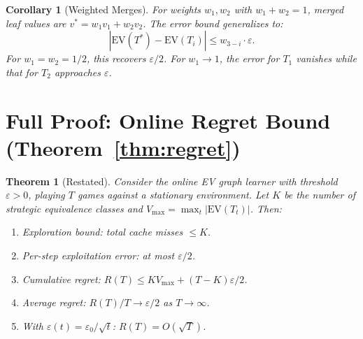 \documentclass[11pt]{article}
\newtheorem*{theorem*}{Theorem}
\newtheorem*{corollary*}{Corollary}
\newcommand{\EV}{\mathrm{EV}}
\begin{document}
\begin{corollary*}[Weighted Merges]
For weights $w_1, w_2$ with $w_1 + w_2 = 1$, merged leaf values are
$v^* = w_1 v_1 + w_2 v_2$. The error bound generalizes to:
\[
  |\EV(T^*) - \EV(T_i)| \le w_{3-i} \cdot \varepsilon.
\]
For $w_1 = w_2 = 1/2$, this recovers $\varepsilon/2$. For $w_1 \to 1$,
the error for $T_1$ vanishes while that for $T_2$ approaches
$\varepsilon$.
\end{corollary*}

\section{Full Proof: Online Regret Bound (Theorem~\ref{thm:regret})}
\label{app:regret}

\begin{theorem*}[Restated]
Consider the online EV graph learner with threshold $\varepsilon > 0$,
playing $T$ games against a stationary environment. Let $K$ be the
number of strategic equivalence classes and $V_{\max} = \max_t
|\EV(T_t)|$. Then:
\begin{enumerate}[nosep]
  \item Exploration bound: total cache misses $\le K$.
  \item Per-step exploitation error: at most $\varepsilon/2$.
  \item Cumulative regret: $R(T) \le K V_{\max} + (T-K)\varepsilon/2$.
  \item Average regret: $R(T)/T \to \varepsilon/2$ as $T \to \infty$.
  \item With $\varepsilon(t) = \varepsilon_0/\sqrt{t}$: $R(T) =
    O(\sqrt{T})$.
\end{enumerate}
\end{theorem*}
\end{document}
